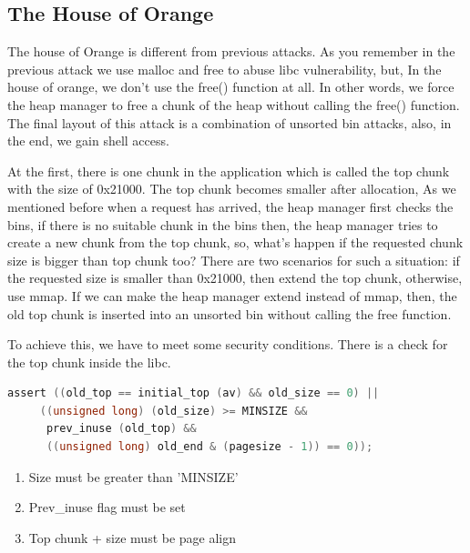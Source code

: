 \documentclass{masterthesis}
\begin{document}
\subsection{The House of Orange}

The house of Orange is different from previous attacks. As you remember in the previous attack we use malloc and free to abuse libc vulnerability, but, In the house of orange, we don’t use the free() function at all. In other words, we force the heap manager to free a chunk of the heap without calling the free() function. The final layout of this attack is a combination of unsorted bin attacks, also, in the end, we gain shell access.

At the first, there is one chunk in the application which is called the top chunk with the size of 0x21000. The top chunk becomes smaller after allocation, As we mentioned before when a request has arrived, the heap manager first checks the bins, if there is no suitable chunk in the bins then, the heap manager tries to create a new chunk from the top chunk, so, what’s happen if the requested chunk size is bigger than top chunk too? There are two scenarios for such a situation: if the requested size is smaller than 0x21000, then extend the top chunk, otherwise, use mmap. If we can make the heap manager extend instead of mmap, then, the old top chunk is inserted into an unsorted bin without calling the free function.

To achieve this, we have to meet some security conditions. There is a check for the top chunk inside the libc. 
\begin{lstlisting}[language=c,frame=tlrb]
 assert ((old_top == initial_top (av) && old_size == 0) ||
     ((unsigned long) (old_size) >= MINSIZE &&
      prev_inuse (old_top) &&
      ((unsigned long) old_end & (pagesize - 1)) == 0));
\end{lstlisting}

\begin{enumerate}
	\item Size must be greater than 'MINSIZE'
	\item Prev\_inuse flag must be set
	\item Top chunk + size must be page align
\end{enumerate}
\end{document}
